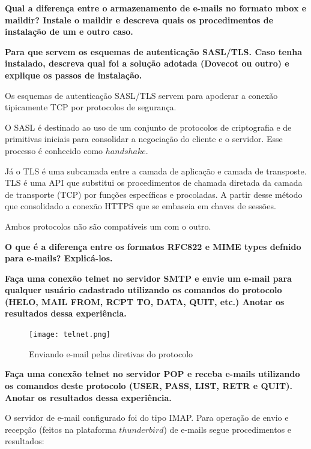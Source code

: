 \documentclass[12pt,answers]{exam}
\begin{document}
\begin{questions}
\question \textbf{Qual a diferença entre o armazenamento de e-mails no formato mbox e maildir? Instale o maildir e descreva quais os procedimentos de instalação de um e outro caso.}



\question \textbf{Para que servem os esquemas de autenticação SASL/TLS. Caso tenha instalado, descreva qual foi a solução adotada (Dovecot ou outro) e explique os passos de instalação.}

  Os esquemas de autenticação SASL/TLS servem para apoderar a conexão tipicamente TCP por protocolos de segurança. 

O SASL é destinado ao uso de um conjunto de protocolos de criptografia e de primitivas iniciais para consolidar a negociação do cliente e o servidor. Esse processo é conhecido como $handshake$.

Já o TLS é uma subcamada entre a camada de aplicação e camada de transposte. TLS é uma API que substitui os procedimentos de chamada diretada da camada de transporte (TCP) por funções específicas e procoladas. A partir desse método que consolidado a conexão HTTPS que se embaseia em chaves de sessões.

Ambos protocolos não são compatíveis um com o outro.

\question \textbf{O que é a diferença entre os formatos RFC822 e MIME types defnido para e-mails? Explicá-los.}




\question \textbf{ Faça uma conexão telnet no servidor SMTP e envie um e-mail para qualquer usuário cadastrado utilizando os comandos do protocolo (HELO, MAIL FROM, RCPT TO, DATA, QUIT, etc.) Anotar os resultados dessa experiência.}

\begin{figure}[h]
     \centering
       \texttt{[image: telnet.png]}
     \caption{Enviando e-mail pelas diretivas do protocolo}
\end{figure}


\question \textbf{Faça uma conexão telnet no servidor POP e receba e-mails utilizando os comandos deste protocolo (USER, PASS, LIST, RETR e QUIT). Anotar os resultados dessa experiência.}

O servidor de e-mail configurado foi do tipo IMAP. Para operação de envio e recepção (feitos na plataforma $thunderbird$) de e-mails segue procedimentos e resultados:


\end{questions}
\end{document}
